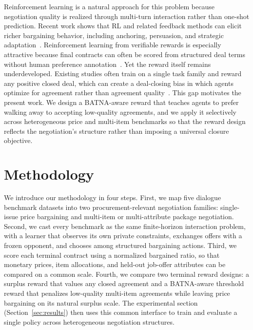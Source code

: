 \documentclass{interact}
\theoremstyle{plain}
\theoremstyle{definition}
\theoremstyle{remark}
\begin{document}
Reinforcement learning is a natural approach for this problem because negotiation quality is realized through multi-turn interaction rather than one-shot prediction. Recent work shows that RL and related feedback methods can elicit richer bargaining behavior, including anchoring, persuasion, and strategic adaptation~\cite{liu2026instructing,vendrell2026gametalk,zeng2025repo,long2025evoemo,oh2026merit}. Reinforcement learning from verifiable rewards is especially attractive because final contracts can often be scored from structured deal terms without human preference annotation~\cite{liu2026instructing,shao2024deepseekmath}. Yet the reward itself remains underdeveloped. Existing studies often train on a single task family and reward any positive closed deal, which can create a deal-closing bias in which agents optimize for agreement rather than agreement quality~\cite{bergemann2026bilateral}. This gap motivates the present work. We design a BATNA-aware reward that teaches agents to prefer walking away to accepting low-quality agreements, and we apply it selectively across heterogeneous price and multi-item benchmarks so that the reward design reflects the negotiation's structure rather than imposing a universal closure objective.

\section{Methodology}\label{sec:method}

We introduce our methodology in four steps. First, we map five dialogue benchmark datasets into two procurement-relevant negotiation families: single-issue price bargaining and multi-item or multi-attribute package negotiation. Second, we cast every benchmark as the same finite-horizon interaction problem, with a learner that observes its own private constraints, exchanges offers with a frozen opponent, and chooses among structured bargaining actions. Third, we score each terminal contract using a normalized bargained ratio, so that monetary prices, item allocations, and held-out job-offer attributes can be compared on a common scale. Fourth, we compare two terminal reward designs: a surplus reward that values any closed agreement and a BATNA-aware threshold reward that penalizes low-quality multi-item agreements while leaving price bargaining on its natural surplus scale. The experimental section (Section~\ref{sec:results}) then uses this common interface to train and evaluate a single policy across heterogeneous negotiation structures.
\end{document}
